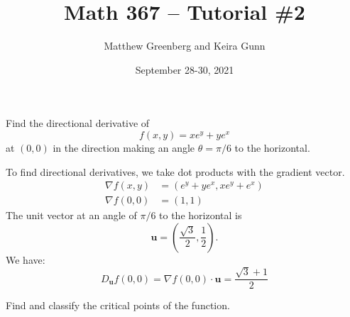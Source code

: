 \documentclass{exam}
\newcommand{\vu}{\mathbf{u}}
\begin{document}
\title{Math 367 -- Tutorial \#2}
\author{Matthew Greenberg and Keira Gunn}
\date{September 28-30, 2021}
\maketitle

\begin{questions}
    \setlength\itemsep{1em}
    \question Find the directional derivative of
    \[
        f(x,y) = xe^y + ye^x
    \]
    at $(0,0)$ in the direction making an angle $\theta=\pi/6$ to the horizontal.

    \begin{solution}
        To find directional derivatives, we take dot products with the gradient vector.
        \begin{align*}
            \nabla f(x,y) &= (e^y + ye^x, xe^y + e^x)\\
            \nabla f(0,0) &= (1,1)
        \end{align*}
    The unit vector at an angle of $\pi/6$ to the horizontal is
    \[
        \vu = \left(\frac{\sqrt3}2,\frac{1}{2}\right).
    \]
    We have:
    \[
        D_\vu f(0,0) = \nabla f(0,0)\cdot \vu = \frac{\sqrt3 + 1}{2}
    \]
    \end{solution}

    \question
    Find and classify the critical points of the function.

\end{questions}
\end{document}
